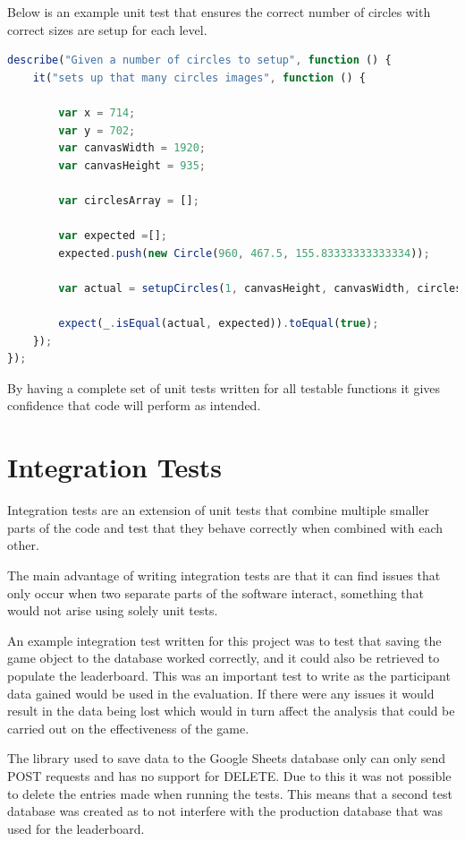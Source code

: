 \documentclass[12pt,a4paper]{report}
\begin{document}
Below is an example unit test that ensures the correct number of circles with correct sizes are setup for each level. 

\begin{minipage}{\linewidth}
\begin{lstlisting}[language=JavaScript]
describe("Given a number of circles to setup", function () {
    it("sets up that many circles images", function () {

        var x = 714;
        var y = 702;
        var canvasWidth = 1920;
        var canvasHeight = 935;

        var circlesArray = [];

        var expected =[];
        expected.push(new Circle(960, 467.5, 155.83333333333334));

        var actual = setupCircles(1, canvasHeight, canvasWidth, circlesArray);

        expect(_.isEqual(actual, expected)).toEqual(true);
    });
});
\end{lstlisting}
\end{minipage}

By having a complete set of unit tests written for all testable functions it gives confidence that code will perform as intended.

\section{Integration Tests}
Integration tests are an extension of unit tests that combine multiple smaller parts of the code and test that they behave correctly when combined with each other. 

The main advantage of writing integration tests are that it can find issues that only occur when two separate parts of the software interact, something that would not arise using solely unit tests. 

An example integration test written for this project was to test that saving the game object to the database worked correctly, and it could also be retrieved to populate the leaderboard. This was an important test to write as the participant data gained would be used in the evaluation. If there were any issues it would result in the data being lost which would in turn affect the analysis that could be carried out on the effectiveness of the game. 

The library used to save data to the Google Sheets database only can only send POST requests and has no support for DELETE. Due to this it was not possible to delete the entries made when running the tests. This means that a second test database was created as to not interfere with the production database that was used for the leaderboard. 
\end{document}
